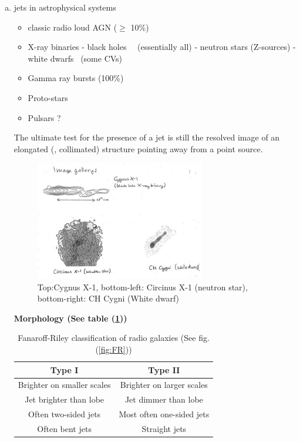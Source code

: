    \begin{enumerate}[a)]
      \item jets in astrophysical systems 
      \begin{itemize}
          \item classic radio loud AGN ($\ge$ 10\%)
          \item X-ray binaries
             \subitem - black holes ~~(essentially all)
             \subitem - neutron stars (Z-sources)
             \subitem - white dwarfs ~(some CVs)
          \item Gamma ray bursts (100\%)
          \item Proto-stars
          \item Pulsars ?
      \end{itemize}
   The ultimate test for the presence of a jet is still the resolved image of an elongated (\ie, collimated)
   structure pointing away from a point source.

\begin{figure}[!htbp]
   \centering
   \includegraphics[width=0.7\textwidth]{HighEnergy/note03}
   \caption{Top:Cygnus X-1, bottom-left: Circinus X-1 (neutron star), bottom-right: CH Cygni (White dwarf)}
\end{figure}

\textbf{Morphology (See table (\ref{tab:agn}))}

   \begin{table}[ht]
   \caption{Fanaroff-Riley classification of radio galaxies (See fig.(\ref{fig:FR}))}
   \centering
   \begin{tabular}{cc}
   \hline \hline
   Type I & Type II \\ [0.5ex]
   \hline
   Brighter on smaller scales & Brighter on larger scales \\
   Jet brighter than lobe     & Jet dimmer than lobe      \\ 
   Often two-sided jets       & Most often one-sided jets \\
   Often bent jets            & Straight jets             \\ [1ex]
   \hline
   \end{tabular}
   \label{tab:agn}
   \end{table}


\end{enumerate}
